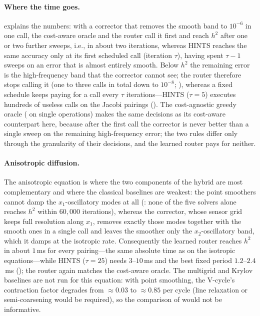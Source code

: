 \paragraph{Where the time goes.}  explains the numbers: with a corrector that removes the smooth band to $10^{-6}$ in one call, the cost-aware oracle and the router call it first and reach $h^2$ after one or two further sweeps, i.e., in about two iterations, whereas HINTS reaches the same accuracy only at its first scheduled call (iteration $\tau$), having spent $\tau{-}1$ sweeps on an error that is almost entirely smooth. Below $h^2$ the remaining error is the high-frequency band that the corrector cannot see; the router therefore stops calling it (one to three calls in total down to $10^{-8}$; ), whereas a fixed schedule keeps paying for a call every $\tau$ iterations---HINTS ($\tau{=}5$) executes hundreds of useless calls on the Jacobi pairings (). The cost-agnostic greedy oracle ( on single operations) makes the same decisions as its cost-aware counterpart here, because after the first call the corrector is never better than a single sweep on the remaining high-frequency error; the two rules differ only through the granularity of their decisions, and the learned router pays for neither.

\paragraph{Anisotropic diffusion.} The anisotropic equation is where the two components of the hybrid are most complementary and where the classical baselines are weakest: the point smoothers cannot damp the $x_1$-oscillatory modes at all (: none of the five solvers alone reaches $h^2$ within $60{,}000$ iterations), whereas the corrector, whose sensor grid keeps full resolution along $x_1$, removes exactly those modes together with the smooth ones in a single call and leaves the smoother only the $x_2$-oscillatory band, which it damps at the isotropic rate. Consequently the learned router reaches $h^2$ in about $1$\,ms for every pairing---the same absolute time as on the isotropic equations---while HINTS ($\tau{=}25$) needs $3$--$10$\,ms and the best fixed period $1.2$--$2.4$\,ms (); the router again matches the cost-aware oracle. The multigrid and Krylov baselines are not run for this equation: with point smoothing, the V-cycle's contraction factor degrades from $\approx 0.03$ to $\approx 0.85$ per cycle (line relaxation or semi-coarsening would be required), so the comparison of  would not be informative.

